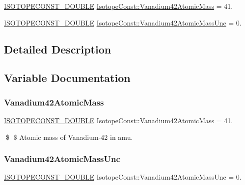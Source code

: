 \begin{DoxyCompactItemize}
\item 
\mbox{\hyperlink{group___isotope_const-_macros_ga8f45a7272ce02c0b4c65c44636ed719a}{I\+S\+O\+T\+O\+P\+E\+C\+O\+N\+S\+T\+\_\+\+D\+O\+U\+B\+LE}} \mbox{\hyperlink{group___isotope_const-_vanadium-_v42_gae3bc9d463cda7e9bf2e8b4fa5b159492}{Isotope\+Const\+::\+Vanadium42\+Atomic\+Mass}} = 41.
\item 
\mbox{\hyperlink{group___isotope_const-_macros_ga8f45a7272ce02c0b4c65c44636ed719a}{I\+S\+O\+T\+O\+P\+E\+C\+O\+N\+S\+T\+\_\+\+D\+O\+U\+B\+LE}} \mbox{\hyperlink{group___isotope_const-_vanadium-_v42_ga8dd2fe8ba396b192f260448d1eb32773}{Isotope\+Const\+::\+Vanadium42\+Atomic\+Mass\+Unc}} = 0.
\end{DoxyCompactItemize}


\subsection{Detailed Description}


\subsection{Variable Documentation}
\mbox{\label{group___isotope_const-_vanadium-_v42_gae3bc9d463cda7e9bf2e8b4fa5b159492}} 
\subsubsection{\texorpdfstring{Vanadium42\+Atomic\+Mass}{Vanadium42AtomicMass}}
{\footnotesize\ttfamily \mbox{\hyperlink{group___isotope_const-_macros_ga8f45a7272ce02c0b4c65c44636ed719a}{I\+S\+O\+T\+O\+P\+E\+C\+O\+N\+S\+T\+\_\+\+D\+O\+U\+B\+LE}} Isotope\+Const\+::\+Vanadium42\+Atomic\+Mass = 41.}

\$ \$ Atomic mass of Vanadium-\/42 in amu. \mbox{\label{group___isotope_const-_vanadium-_v42_ga8dd2fe8ba396b192f260448d1eb32773}} 
\subsubsection{\texorpdfstring{Vanadium42\+Atomic\+Mass\+Unc}{Vanadium42AtomicMassUnc}}
{\footnotesize\ttfamily \mbox{\hyperlink{group___isotope_const-_macros_ga8f45a7272ce02c0b4c65c44636ed719a}{I\+S\+O\+T\+O\+P\+E\+C\+O\+N\+S\+T\+\_\+\+D\+O\+U\+B\+LE}} Isotope\+Const\+::\+Vanadium42\+Atomic\+Mass\+Unc = 0.}


